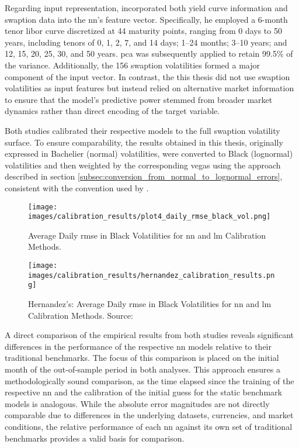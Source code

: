 Regarding input representation, \textcite{hernandez2016model} incorporated both yield curve information and swaption data into the \ac{nn}'s feature vector. Specifically, he employed a 6-month tenor \ac{libor} curve discretized at 44 maturity points, ranging from 0 days to 50 years, including tenors of 0, 1, 2, 7, and 14 days; 1--24 months; 3--10 years; and 12, 15, 20, 25, 30, and 50 years. \ac{pca} was subsequently applied to retain 99.5\% of the variance. Additionally, the 156 swaption volatilities formed a major component of the input vector. In contrast, the this thesis did not use swaption volatilities as input features but instead relied on alternative market information to ensure that the model's predictive power stemmed from broader market dynamics rather than direct encoding of the target variable.

Both studies calibrated their respective models to the full swaption volatility surface. To ensure comparability, the results obtained in this thesis, originally expressed in Bachelier (normal) volatilities, were converted to Black (lognormal) volatilities and then weighted by the corresponding vegas using the approach described in section \ref{subsec:conversion_from_normal_to_lognormal_errors}, consistent with the convention used by \textcite{hernandez2016model}.

\begin{figure}[H]
	\centering
	\texttt{[image: images/calibration\_results/plot4\_daily\_rmse\_black\_vol.png]}
	\caption{Average Daily \ac{rmse} in Black Volatilities for \ac{nn} and \ac{lm} Calibration Methods.}
	\label{fig:daily_rmse_black_vol}
\end{figure}

\begin{figure}[H]
	\centering
	\texttt{[image: images/calibration\_results/hernandez\_calibration\_results.png]}
	\caption{Hernandez's: Average Daily \ac{rmse} in Black Volatilities for \ac{nn} and \ac{lm} Calibration Methods. Source: \parencite[figure~3]{hernandez2016model}}
	\label{fig:daily_rmse_black_vol_herandez}
\end{figure}


A direct comparison of the empirical results from both studies reveals significant differences in the performance of the respective \ac{nn} models relative to their traditional benchmarks. The focus of this comparison is placed on the initial month of the out-of-sample period in both analyses. This approach ensures a methodologically sound comparison, as the time elapsed since the training of the respective \ac{nn} and the calibration of the initial guess for the static benchmark models is analogous. While the absolute error magnitudes are not directly comparable due to differences in the underlying datasets, currencies, and market conditions, the relative performance of each \ac{nn} against its own set of traditional benchmarks provides a valid basis for comparison.

